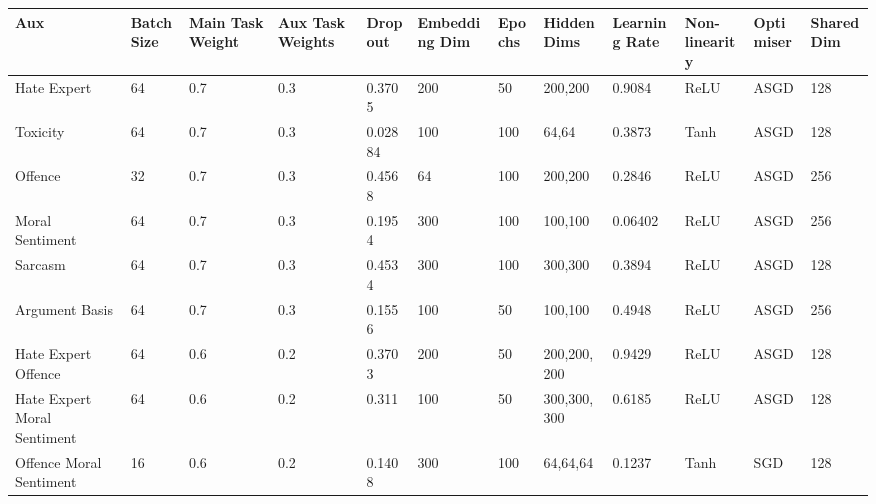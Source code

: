 \begin{landscape}
  \begin{table}[]
    \centering
    \begin{tabular}{l|lllllllllll}
      Aux                                         & Batch Size & Main Task Weight & Aux Task Weights & Dropout & Embedding Dim & Epochs & Hidden Dims     & Learning Rate & Non-linearity & Optimiser & Shared Dim \\ \hline
      Hate Expert                                 & 64         & 0.7              & 0.3              & 0.3705  & 200           & 50     & 200,200         & 0.9084        & ReLU          & ASGD      & 128        \\
      Toxicity                                    & 64         & 0.7              & 0.3              & 0.02884 & 100           & 100    & 64,64           & 0.3873        & Tanh          & ASGD      & 128        \\
      Offence                                     & 32         & 0.7              & 0.3              & 0.4568  & 64            & 100    & 200,200         & 0.2846        & ReLU          & ASGD      & 256        \\
      Moral Sentiment                             & 64         & 0.7              & 0.3              & 0.1954  & 300           & 100    & 100,100         & 0.06402       & ReLU          & ASGD      & 256        \\
      Sarcasm                                     & 64         & 0.7              & 0.3              & 0.4534  & 300           & 100    & 300,300         & 0.3894        & ReLU          & ASGD      & 128        \\
      Argument Basis                              & 64         & 0.7              & 0.3              & 0.1556  & 100           & 50     & 100,100         & 0.4948        & ReLU          & ASGD      & 256        \\ \hline
      Hate Expert Offence                         & 64         & 0.6              & 0.2              & 0.3703  & 200           & 50     & 200,200,200     & 0.9429        & ReLU          & ASGD      & 128        \\
      Hate Expert Moral Sentiment                 & 64         & 0.6              & 0.2              & 0.311   & 100           & 50     & 300,300,300     & 0.6185        & ReLU          & ASGD      & 128        \\
      Offence Moral Sentiment                     & 16         & 0.6              & 0.2              & 0.1408  & 300           & 100    & 64,64,64        & 0.1237        & Tanh          & SGD       & 128        \\

\end{tabular}
\end{table}
\end{landscape}
